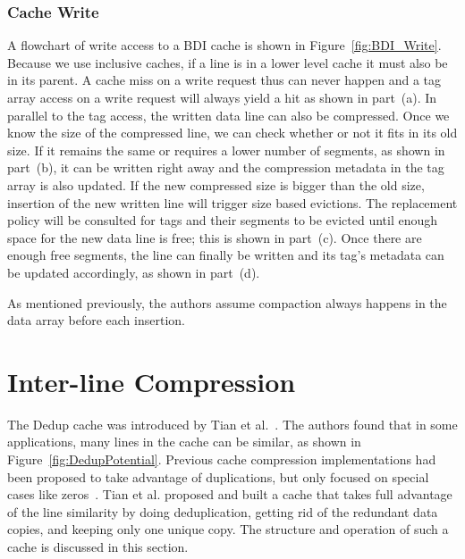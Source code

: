 \subsubsection{Cache Write}
A flowchart of write access to a BDI cache is shown in Figure~\ref{fig:BDI_Write}. Because we use inclusive caches, if a line is in a lower level cache it must also be in its parent. A cache miss on a write request thus can never happen and a tag array access on a write request will always yield a hit as shown in part~(a). In parallel to the tag access, the written data line can also be compressed. Once we know the size of the compressed line, we can check whether or not it fits in its old size. If it remains the same or requires a lower number of segments, as shown in part~(b), it can be written right away and the compression metadata in the tag array is also updated. If the new compressed size is bigger than the old size, insertion of the new written line will trigger size based evictions. The replacement policy will be consulted for tags and their segments to be evicted until enough space for the new data line is free; this is shown in part~(c). Once there are enough free segments, the line can finally be written and its tag's metadata can be updated accordingly, as shown in part~(d).\par
As mentioned previously, the authors assume compaction always happens in the data array before each insertion.

\section{Inter-line Compression}
\label{sec:Dedup}
The Dedup cache was introduced by Tian et al.~\cite{dedup}. The authors found that in some applications, many lines in the cache can be similar, as shown in Figure~\ref{fig:DedupPotential}. Previous cache compression implementations had been proposed to take advantage of duplications, but only focused on special cases like zeros~\cite{alameldeen2004adaptive, dusser2009zero}. Tian et al. proposed and built a cache that takes full advantage of the line similarity by doing deduplication, getting rid of the redundant data copies, and keeping only one unique copy. The structure and operation of such a cache is discussed in this section.
